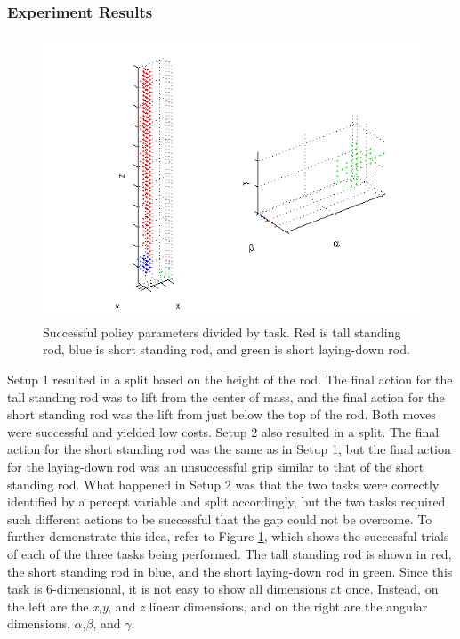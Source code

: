 \documentclass[12pt]{article}
\begin{document}
\subsubsection{Experiment Results}

\begin{figure}[ht]
  \centerline{
  \includegraphics[width=0.9\columnwidth]{6d.png}}
  \caption{\label{fig_label} Successful policy parameters divided by task. Red is tall standing rod, blue is short standing rod, and green is short laying-down rod.}
  \label{fig:6d}
\end{figure}

Setup 1 resulted in a split based on the height of the rod. The final action for the tall standing rod was to lift from the center of mass, and the final action for the short standing rod was the lift from just below the top of the rod. Both moves were successful and yielded low costs. Setup 2 also resulted in a split. The final action for the short standing rod was the same as in Setup 1, but the final action for the laying-down rod was an unsuccessful grip similar to that of the short standing rod. What happened in Setup 2 was that the two tasks were correctly identified by a percept variable and split accordingly, but the two tasks required such different actions to be successful that the gap could not be overcome. To further demonstrate this idea, refer to Figure \ref{fig:6d}, which shows the successful trials of each of the three tasks being performed. The tall standing rod is shown in red, the short standing rod in blue, and the short laying-down rod in green. Since this task is 6-dimensional, it is not easy to show all dimensions at once. Instead, on the left are the \emph{x},\emph{y}, and \emph{z} linear dimensions, and on the right are the angular dimensions, \emph{$\alpha$},\emph{$\beta$}, and \emph{$\gamma$}. 
\end{document}
